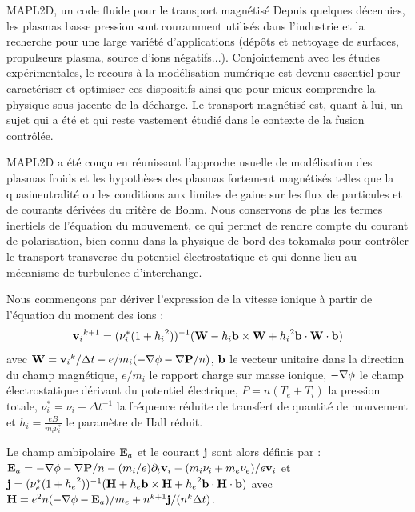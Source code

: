 \documentclass[a4paper,11pt]{article} %
\begin{document}
\begin{section}{MAPL2D, un code fluide pour le transport magnétisé}
Depuis quelques décennies, les plasmas basse pression sont couramment utilisés dans l'industrie et 
la recherche pour une large variété d'applications (dépôts et nettoyage de surfaces, propulseurs plasma, source d'ions
négatifs...). Conjointement avec les études expérimentales, le recours à la modélisation numérique est devenu essentiel
pour caractériser et optimiser ces dispositifs ainsi que pour mieux comprendre la physique sous-jacente de la décharge.
Le transport magnétisé est, quant à lui, un sujet qui a été et qui reste vastement étudié dans le contexte de la fusion 
contrôlée. 

MAPL2D a été conçu en réunissant l'approche usuelle de modélisation des plasmas froids et les hypothèses des plasmas 
fortement magnétisés telles que la quasineutralité ou les conditions aux limites de gaine sur les flux de particules 
et de courants dérivées du critère de Bohm. Nous conservons de plus les termes inertiels de l'équation du mouvement, 
ce qui permet de rendre compte du courant de polarisation, bien connu dans la physique de bord des tokamaks pour contrôler 
le transport transverse du potentiel électrostatique\cite{Sarazin} et qui donne lieu au mécanisme de turbulence 
d'interchange.

Nous commençons par dériver l'expression de la vitesse ionique à partir de l'équation du moment des ions :
$${\mathbf{v}_i}^{k+1}=(\nu_i^*(1+{h_i}^2))^{-1}(\mathbf{W}-h_i\mathbf{b}\times\mathbf{W}+{h_i}^2\mathbf{b}\cdot\mathbf{W}\cdot\mathbf{b})$$
avec 
$\mathbf{W}={\mathbf{v}_i}^{k}/\Delta t-e/m_i(-\mathbf{\nabla\phi}-\mathbf{\nabla P}/n)$, 
$\mathbf{b}$ le vecteur unitaire dans la direction du champ magnétique, $e/m_i$ le rapport charge sur masse ionique, 
$-\mathbf{\nabla\phi}$ le champ électrostatique dérivant du potentiel électrique, $P=n(T_e+T_i)$ la pression totale,
$\nu_i^*=\nu_i+\Delta t^{-1}$ la fréquence réduite de transfert de quantité de mouvement et $h_i=\frac{eB}{m_i\nu_i^*}$ 
le paramètre de Hall réduit. 

Le champ ambipolaire $\mathbf{E}_a$ et le courant $\mathbf{j}$ sont alors définis par :\\
$\mathbf{E}_a=-\mathbf{\nabla\phi}-\mathbf{\nabla P}/n-(m_i/e)\partial_t\mathbf{v}_i-(m_i\nu_i+m_e\nu_e)/e\mathbf{v}_i$ et 
$\mathbf{j}=(\nu_e^*(1+{h_e}^2))^{-1}(\mathbf{H}+h_e\mathbf{b}\times\mathbf{H}+{h_e}^2\mathbf{b}\cdot\mathbf{H}\cdot\mathbf{b})$
avec $\mathbf{H}=e^2n(-\mathbf{\nabla\phi}-\mathbf{E}_a)/m_e+n^{k+1}\mathbf{j}/(n^k\Delta t)$.\\


\end{section}
\end{document}
